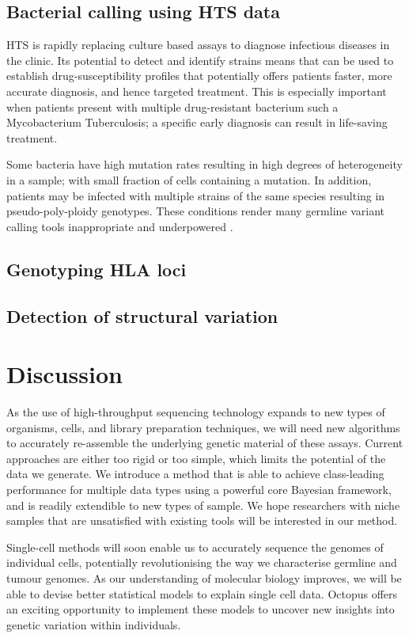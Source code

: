 \documentclass[notitlepage, twocolumn]{article}
\begin{document}
\subsection*{Bacterial calling using HTS data}

HTS is rapidly replacing culture based assays to diagnose infectious diseases in the clinic. Its potential to detect and identify strains means that can be used to establish drug-susceptibility profiles that potentially offers patients faster, more accurate diagnosis, and hence targeted treatment. This is especially important when patients present with multiple drug-resistant bacterium such a Mycobacterium Tuberculosis; a specific early diagnosis can result in life-saving treatment.

Some bacteria have high mutation rates resulting in high degrees of heterogeneity in a sample; with small fraction of cells containing a mutation. In addition, patients may be infected with multiple strains of the same species resulting in pseudo-poly-ploidy genotypes. These conditions render many germline variant calling tools inappropriate and underpowered \cite{RN165}.

\subsection*{Genotyping HLA loci}

\subsection*{Detection of structural variation}

\section*{Discussion}

As the use of high-throughput sequencing technology expands to new types of organisms, cells, and library preparation techniques, we will need new algorithms to accurately re-assemble the underlying genetic material of these assays. Current approaches are either too rigid or too simple, which limits the potential of the data we generate. We introduce a method that is able to achieve class-leading performance for multiple data types using a powerful core Bayesian framework, and is readily extendible to new types of sample. We hope researchers with niche samples that are unsatisfied with existing tools will be interested in our method.

Single-cell methods will soon enable us to accurately sequence the genomes of individual cells, potentially revolutionising the way we characterise germline and tumour genomes. As our understanding of molecular biology improves, we will be able to devise better statistical models to explain single cell data. Octopus offers an exciting opportunity to implement these models to uncover new insights into genetic variation within individuals.
\end{document}
